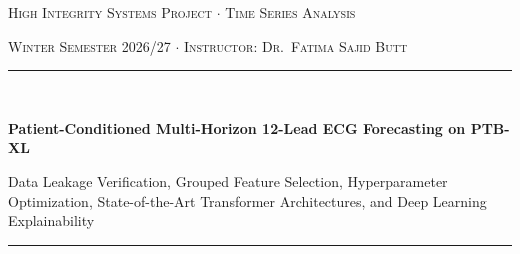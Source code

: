 \documentclass[11pt,a4paper]{article}
\begin{document}
\sloppy

\begin{titlepage}
    \centering
    \vspace*{1.0cm}
    {\scshape\Large High Integrity Systems Project $\cdot$ Time Series Analysis\par}
    \vspace{0.3cm}
    {\scshape\large Winter Semester 2026/27 $\cdot$ Instructor: Dr.\ Fatima Sajid Butt\par}
    \vspace{1.2cm}
    \rule{\linewidth}{1.5pt}\\[0.4cm]
    {\huge\bfseries\color{navy} Patient-Conditioned Multi-Horizon 12-Lead ECG Forecasting on PTB-XL\par}
    \vspace{0.3cm}
    {\Large\color{steelblue} Data Leakage Verification, Grouped Feature Selection, Hyperparameter Optimization, State-of-the-Art Transformer Architectures, and Deep Learning Explainability\par}
    \vspace{0.3cm}
    \rule{\linewidth}{1.5pt}\\[1.0cm]


\end{titlepage}
\end{document}
